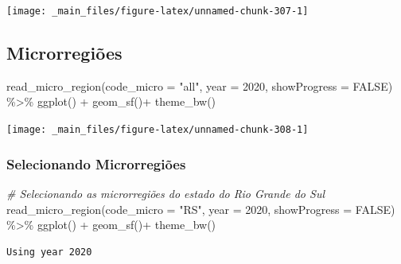 \documentclass[
  brazilian,
]{book}
\newenvironment{Shaded}{\begin{snugshade}}{\end{snugshade}}
\newcommand{\AttributeTok}[1]{\textcolor[rgb]{0.77,0.63,0.00}{#1}}
\newcommand{\CommentTok}[1]{\textcolor[rgb]{0.56,0.35,0.01}{\textit{#1}}}
\newcommand{\ConstantTok}[1]{\textcolor[rgb]{0.00,0.00,0.00}{#1}}
\newcommand{\DecValTok}[1]{\textcolor[rgb]{0.00,0.00,0.81}{#1}}
\newcommand{\FunctionTok}[1]{\textcolor[rgb]{0.00,0.00,0.00}{#1}}
\newcommand{\NormalTok}[1]{#1}
\newcommand{\SpecialCharTok}[1]{\textcolor[rgb]{0.00,0.00,0.00}{#1}}
\newcommand{\StringTok}[1]{\textcolor[rgb]{0.31,0.60,0.02}{#1}}
\begin{document}
\begin{center}\texttt{[image: \_main\_files/figure-latex/unnamed-chunk-307-1]} \end{center}

\hypertarget{microrregiuxf5es}{%
\subsection{Microrregiões}\label{microrregiuxf5es}}

\begin{Shaded}
\begin{Highlighting}[]
\FunctionTok{read\_micro\_region}\NormalTok{(}\AttributeTok{code\_micro =} \StringTok{"all"}\NormalTok{,}
                  \AttributeTok{year =} \DecValTok{2020}\NormalTok{,}
                  \AttributeTok{showProgress =} \ConstantTok{FALSE}\NormalTok{) }\SpecialCharTok{\%\textgreater{}\%} 
  \FunctionTok{ggplot}\NormalTok{() }\SpecialCharTok{+}
  \FunctionTok{geom\_sf}\NormalTok{()}\SpecialCharTok{+}
  \FunctionTok{theme\_bw}\NormalTok{()}
\end{Highlighting}
\end{Shaded}

\begin{center}\texttt{[image: \_main\_files/figure-latex/unnamed-chunk-308-1]} \end{center}

\hypertarget{selecionando-microrregiuxf5es}{%
\subsubsection{Selecionando Microrregiões}\label{selecionando-microrregiuxf5es}}

\begin{Shaded}
\begin{Highlighting}[]
\CommentTok{\# Selecionando as microrregiões do estado do Rio Grande do Sul}
\FunctionTok{read\_micro\_region}\NormalTok{(}\AttributeTok{code\_micro =} \StringTok{"RS"}\NormalTok{,}
                  \AttributeTok{year =} \DecValTok{2020}\NormalTok{,}
                  \AttributeTok{showProgress =} \ConstantTok{FALSE}\NormalTok{) }\SpecialCharTok{\%\textgreater{}\%} 
  \FunctionTok{ggplot}\NormalTok{() }\SpecialCharTok{+}
  \FunctionTok{geom\_sf}\NormalTok{()}\SpecialCharTok{+}
  \FunctionTok{theme\_bw}\NormalTok{()}
\end{Highlighting}
\end{Shaded}

\begin{verbatim}
Using year 2020
\end{verbatim}
\end{document}
